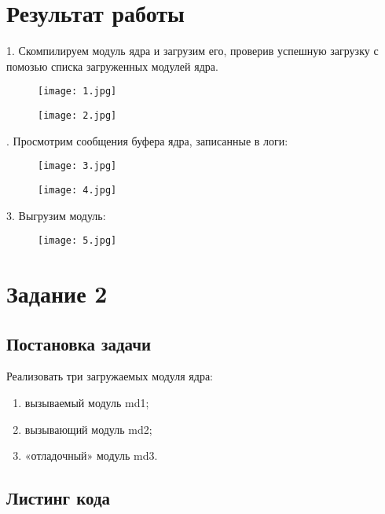 \section*{Результат работы}
1. Скомпилируем модуль ядра и загрузим его, проверив успешную загрузку с помозью списка загруженных модулей ядра.
\begin{figure}[h!]
\center\texttt{[image: 1.jpg]}
\end{figure}
\begin{figure}[h!]
\center\texttt{[image: 2.jpg]}
\end{figure}
. Просмотрим сообщения буфера ядра, записанные в логи:
\begin{figure}[h!]
\center\texttt{[image: 3.jpg]}
\end{figure}
\newpage
\begin{figure}[h!]
	\center\texttt{[image: 4.jpg]}
\end{figure}
3. Выгрузим модуль:
\begin{figure}[h!]
\center\texttt{[image: 5.jpg]}
\end{figure}
\newpage
\section*{Задание 2}
\subsection*{Постановка задачи}
Реализовать три загружаемых модуля ядра:
\begin{enumerate}

	\item вызываемый модуль md1;
	\item вызывающий модуль md2;
	\item «отладочный» модуль md3.
\end{enumerate}



\subsection*{Листинг кода}


